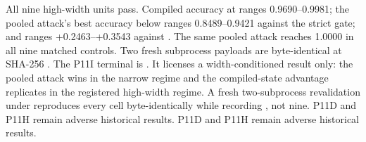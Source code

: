 {}All nine high-width units pass. Compiled accuracy at  ranges 0.9690–0.9981; the pooled attack's best accuracy below  ranges 0.8489–0.9421 against the strict  gate; and  ranges +0.2463–+0.3543 against . The same pooled attack reaches 1.0000 in all nine matched  controls. Two fresh subprocess payloads are byte-identical at SHA-256 .\markdownRendererInterblockSeparator
{}The P11I terminal is . It licenses a width-conditioned result only: the pooled attack wins in the narrow regime and the compiled-state advantage replicates in the registered high-width regime. A fresh two-subprocess revalidation under  reproduces every cell byte-identically while recording , not nine. P11D and P11H remain adverse historical results. P11D and P11H remain adverse historical results.
\markdownRendererSectionEnd 
\markdownRendererSectionEnd \markdownRendererDocumentEnd